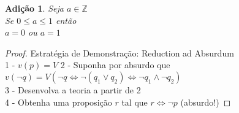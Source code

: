 \documentclass[a4paper,12pt]{article}
\newtheorem{add}{Adição}
\begin{document}
\begin{add} %
  Seja $a \in \mathbb{Z}$\\
  Se $0 \leq a \leq 1$ então\\
  $a = 0$ ou $a = 1$
\end{add}
\begin{proof}
  Estratégia de Demonstração: Reduction ad Absurdum\\

  1 - $v(p) =V$
  2 - Suponha por absurdo que $v(\neg q) = V (\neg q \iff \neg (q_1 \vee q_2) \iff \neg q_1 \wedge \neg q_2)$\\
  3 - Desenvolva a teoria a partir de 2\\
  4 - Obtenha uma proposição $r$ tal que $r \iff \neg p$ (absurdo!)
\end{proof}
\end{document}
